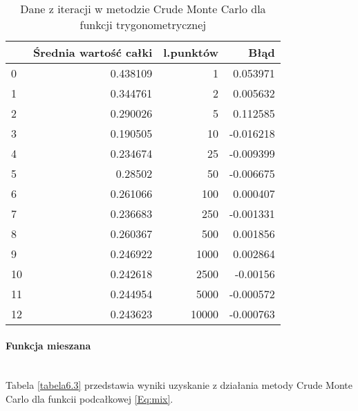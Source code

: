 \documentclass[12pt,twoside]{article}
\begin{document}
\begin{table}[H]
\centering 
\caption{Dane z iteracji w metodzie Crude Monte Carlo dla funkcji trygonometrycznej}
\label{tabela6.2}
\begin{tabular}{lrrr}
\toprule
{} &  Średnia wartość całki &  l.punktów &      Błąd \\
\midrule
0  &               0.438109 &       1 &  0.053971 \\
1  &               0.344761 &       2 &  0.005632 \\
2  &               0.290026 &       5 &  0.112585 \\
3  &               0.190505 &      10 & -0.016218 \\
4  &               0.234674 &      25 & -0.009399 \\
5  &                0.28502 &      50 & -0.006675 \\
6  &               0.261066 &     100 &  0.000407 \\
7  &               0.236683 &     250 & -0.001331 \\
8  &               0.260367 &     500 &  0.001856 \\
9  &               0.246922 &    1000 &  0.002864 \\
10 &               0.242618 &    2500 & -0.00156 \\
11 &               0.244954 &    5000 & -0.000572 \\
12 &               0.243623 &   10000 & -0.000763 \\
\bottomrule
\end{tabular}
\end{table}

\paragraph{Funkcja mieszana}\mbox{} \\

Tabela \eqref{tabela6.3} przedstawia wyniki uzyskanie z działania metody Crude Monte Carlo dla funkcii podcałkowej \eqref{Eq:mix}.
\end{document}

